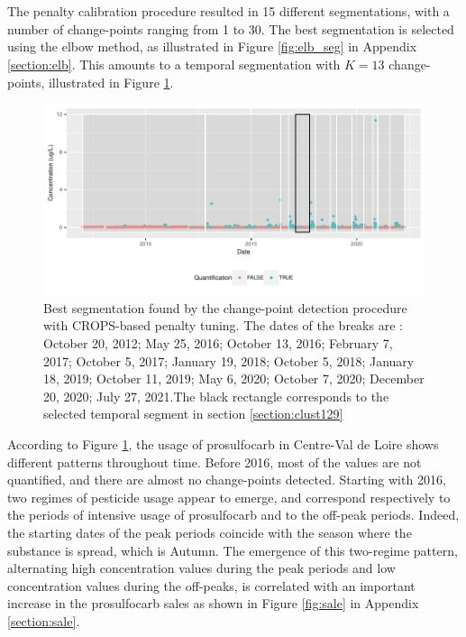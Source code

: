 The penalty calibration procedure resulted in 15 different segmentations, with a number of change-points ranging from 1 to 30. The best segmentation is selected using the elbow method, as illustrated in Figure \ref{fig:elb_seg} in Appendix \ref{section:elb}. This amounts to a temporal segmentation with $\hat K=13$ change-points, illustrated in Figure \ref{fig:seg}. 
 
\begin{figure}[htbp]
  \centering
  \includegraphics[]{figs/Chap5/Seg_opt.pdf}
  \caption{Best segmentation found by the change-point detection procedure with CROPS-based penalty tuning. The dates of the breaks are : October 20, 2012; May 25, 2016; October 13, 2016; February 7, 2017; October 5, 2017; January 19, 2018; October 5, 2018; January 18, 2019; October 11, 2019; May 6, 2020; October 7, 2020; December 20, 2020; July 27, 2021.The black rectangle corresponds to the selected temporal segment in section \ref{section:clust129}}\label{fig:seg}
\end{figure}

According to Figure \ref{fig:seg}, the usage of prosulfocarb in Centre-Val de Loire shows different patterns throughout time. Before 2016, most of the values are not quantified, and there are almost no change-points detected. Starting with 2016, two regimes of pesticide usage appear to emerge, and correspond respectively to the periods of intensive usage of prosulfocarb and to the off-peak periods. Indeed, the starting dates of the peak periods coincide with the season where the substance is spread, which is Autumn. The emergence of this two-regime pattern, alternating high concentration values during the peak periods and low concentration values during the off-peaks, is correlated with an important increase in the prosulfocarb sales as shown in Figure \ref{fig:sale} in Appendix \ref{section:sale}. 

